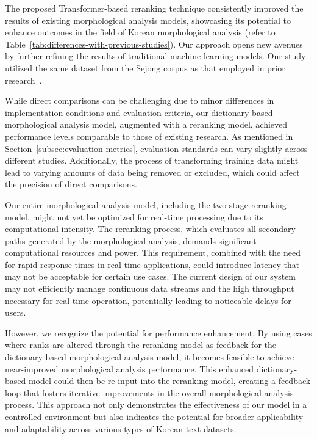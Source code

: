\documentclass[AMS,STIX2COL]{WileyNJD-v2}
\begin{document}
    The proposed Transformer-based reranking technique consistently improved the results of existing morphological analysis models, showcasing its potential to enhance outcomes in the field of Korean morphological analysis (refer to Table~\ref{tab:differences-with-previous-studies}).
    Our approach opens new avenues by further refining the results of traditional machine-learning models.
    Our study utilized the same dataset from the Sejong corpus as that employed in prior research~\cite{MinJW2019, MinJW2020, MinJW2022, MinJW2018, NaSH2015, NaSH2014, NaSH2018, SongHJ2019, SongHJ2020}.

    While direct comparisons can be challenging due to minor differences in implementation conditions and evaluation criteria, our dictionary-based morphological analysis model, augmented with a reranking model, achieved performance levels comparable to those of existing research.
    As mentioned in Section~\ref{subsec:evaluation-metrics}, evaluation standards can vary slightly across different studies.
    Additionally, the process of transforming training data might lead to varying amounts of data being removed or excluded, which could affect the precision of direct comparisons.

    Our entire morphological analysis model, including the two-stage reranking model, might not yet be optimized for real-time processing due to its computational intensity.
    The reranking process, which evaluates all secondary paths generated by the morphological analysis, demands significant computational resources and power.
    This requirement, combined with the need for rapid response times in real-time applications, could introduce latency that may not be acceptable for certain use cases.
    The current design of our system may not efficiently manage continuous data streams and the high throughput necessary for real-time operation, potentially leading to noticeable delays for users.

    However, we recognize the potential for performance enhancement.
    By using cases where ranks are altered through the reranking model as feedback for the dictionary-based morphological analysis model, it becomes feasible to achieve near-improved morphological analysis performance.
    This enhanced dictionary-based model could then be re-input into the reranking model, creating a feedback loop that fosters iterative improvements in the overall morphological analysis process.
    This approach not only demonstrates the effectiveness of our model in a controlled environment but also indicates the potential for broader applicability and adaptability across various types of Korean text datasets.
\end{document}
